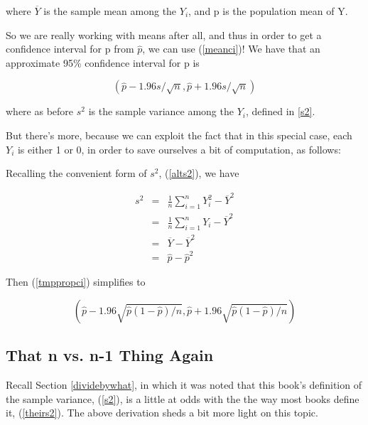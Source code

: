 where $\overline{Y}$ is the sample mean among the $Y_i$,
and p is the population mean of Y.


So we are really working with means after all, and thus in order to get
a confidence interval for p from $\widehat{p}$, we can use
(\ref{meanci})!  We have that an approximate 95\% confidence interval
for p is

\begin{equation}
\label{tmppropci}
\left ( 
\widehat{p} 
- 1.96 s / \sqrt{n},
\widehat{p}
+ 1.96 s / \sqrt{n}
\right ) 
\end{equation}

where as before $s^2$ is the sample variance among the $Y_i$, defined in
\ref{s2}.

But there's more, because we can exploit the fact that in this special
case, each $Y_i$ is either 1 or 0, in order to save ourselves a bit of
computation, as follows:  

Recalling the convenient form of $s^2$, (\ref{alts2}), we have

\begin{eqnarray}
s^2 &=& 
\frac{1}{n} \sum_{i=1}^{n} Y_i^2 - \overline{Y}^2 \label{consistent} \\
&=& \frac{1}{n} \sum_{i=1}^{n} Y_i - \overline{Y}^2 \\
&=& \overline{Y} - \overline{Y}^2 \\
&=& \widehat{p} - \widehat{p}^2 
\end{eqnarray} 

Then (\ref{tmppropci}) simplifies to

\begin{equation}
\label{propci}
\left ( 
\widehat{p} 
- 1.96 \sqrt{\widehat{p} (1-\widehat{p})/n},
\widehat{p}
+ 1.96 \sqrt{\widehat{p} (1-\widehat{p})/n}
\right ) 
\end{equation}

\subsection{That n vs. n-1 Thing Again}
\label{nvsnminu1again}

Recall Section \ref{dividebywhat}, in which it was noted that this
book's definition of the sample variance, (\ref{s2}), is a little at
odds with the the way most books define it, (\ref{theirs2}).  The above
derivation sheds a bit more light on this topic.

